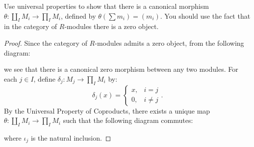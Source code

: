 \documentclass[10pt,oneside,openany]{memoir}
\begin{document}
\begin{exercise}
Use universal properties to show that there is a canonical morphism
$\theta:\coprod_I M_i\longrightarrow\prod_I M_i$, defined by
$\theta(\sum m_i)=(m_i)$. You should use the fact that in the category of
$R$-modules there is a zero object.
\end{exercise}
	{\color{blue}\begin{proof}
		Since the category of $R$-modules admits a zero object, from the following diagram:
		\begin{center}
		\end{center}
		we see that there is a canonical zero morphism between any two modules. For each $j \in I$, define $\delta_j:M_j \rightarrow \prod_{I}M_i$ by:
		\[
			\delta_j(x)=
			\begin{cases}
				x, & i = j \\
				0, & i \neq j
			\end{cases}.
		\] 
		By the Universal Property of Coproducts, there exists a unique map $\theta:\coprod_I M_i \rightarrow \prod_I M_i$ such that the following diagram commutes:
		\begin{center}
		\end{center}
		where $\iota_j$ is the natural inclusion.
	\end{proof}}
\end{document}
